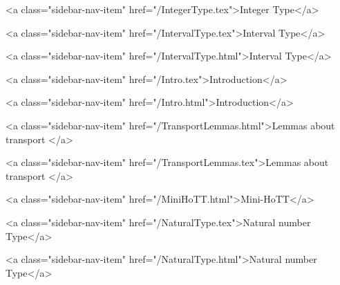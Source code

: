       
    
      
        
          <a class="sidebar-nav-item" href="/IntegerType.tex">Integer Type</a>
        
      
    
      
        
          <a class="sidebar-nav-item" href="/IntervalType.tex">Interval Type</a>
        
      
    
      
        
          <a class="sidebar-nav-item" href="/IntervalType.html">Interval Type</a>
        
      
    
      
        
          <a class="sidebar-nav-item" href="/Intro.tex">Introduction</a>
        
      
    
      
        
          <a class="sidebar-nav-item" href="/Intro.html">Introduction</a>
        
      
    
      
        
          <a class="sidebar-nav-item" href="/TransportLemmas.html">Lemmas about transport </a>
        
      
    
      
        
          <a class="sidebar-nav-item" href="/TransportLemmas.tex">Lemmas about transport </a>
        
      
    
      
        
      
    
      
        
          <a class="sidebar-nav-item" href="/MiniHoTT.html">Mini-HoTT</a>
        
      
    
      
        
          <a class="sidebar-nav-item" href="/NaturalType.tex">Natural number Type</a>
        
      
    
      
        
          <a class="sidebar-nav-item" href="/NaturalType.html">Natural number Type</a>
        
      
    
      
        
